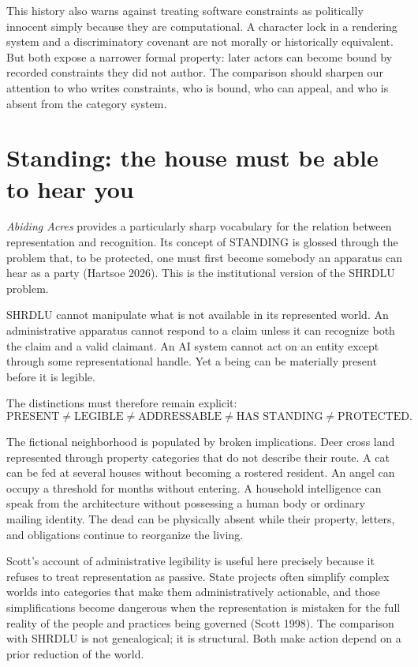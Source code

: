 \documentclass[11pt]{article}
\begin{document}
This history also warns against treating software constraints as politically innocent simply because they are computational. A character lock in a rendering system and a discriminatory covenant are not morally or historically equivalent. But both expose a narrower formal property: later actors can become bound by recorded constraints they did not author. The comparison should sharpen our attention to who writes constraints, who is bound, who can appeal, and who is absent from the category system.

\section{Standing: the house must be able to hear you}

\emph{Abiding Acres} provides a particularly sharp vocabulary for the relation between representation and recognition. Its concept of STANDING is glossed through the problem that, to be protected, one must first become somebody an apparatus can hear as a party (Hartsoe 2026). This is the institutional version of the SHRDLU problem.

SHRDLU cannot manipulate what is not available in its represented world. An administrative apparatus cannot respond to a claim unless it can recognize both the claim and a valid claimant. An AI system cannot act on an entity except through some representational handle. Yet a being can be materially present before it is legible.

The distinctions must therefore remain explicit:
\[
\text{PRESENT} \neq \text{LEGIBLE} \neq \text{ADDRESSABLE} \neq \text{HAS STANDING} \neq \text{PROTECTED}.
\]

The fictional neighborhood is populated by broken implications. Deer cross land represented through property categories that do not describe their route. A cat can be fed at several houses without becoming a rostered resident. An angel can occupy a threshold for months without entering. A household intelligence can speak from the architecture without possessing a human body or ordinary mailing identity. The dead can be physically absent while their property, letters, and obligations continue to reorganize the living.

Scott's account of administrative legibility is useful here precisely because it refuses to treat representation as passive. State projects often simplify complex worlds into categories that make them administratively actionable, and those simplifications become dangerous when the representation is mistaken for the full reality of the people and practices being governed (Scott 1998). The comparison with SHRDLU is not genealogical; it is structural. Both make action depend on a prior reduction of the world.
\end{document}
